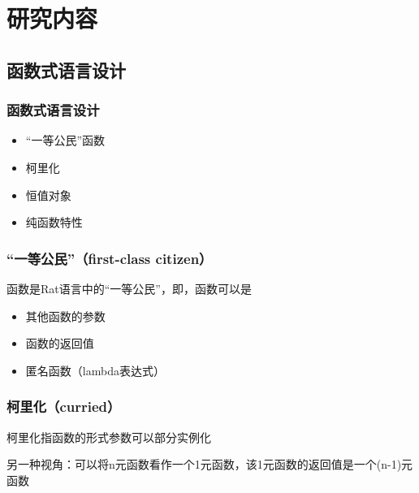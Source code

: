 \documentclass[]{beamer}
\begin{document}
\section{研究内容}
\frame{\tableofcontents[currentsection]}

\subsection{函数式语言设计}

\begin{frame}
  \frametitle{函数式语言设计}
  \begin{itemize}
    \item “一等公民”函数
    \item 柯里化
    \item 恒值对象
    \item 纯函数特性
  \end{itemize}
\end{frame}

\begin{frame}
  \frametitle{“一等公民”（first-class citizen）}
  函数是Rat语言中的“一等公民”，即，函数可以是
  \begin{itemize}
    \item 其他函数的参数
      
    \item 函数的返回值\\
      
    \item 匿名函数（lambda表达式）\\
      
  \end{itemize}
\end{frame}

\begin{frame}
  \frametitle{柯里化（curried）}
  柯里化指函数的形式参数可以部分实例化
  

  另一种视角：可以将n元函数看作一个1元函数，该1元函数的返回值是一个(n-1)元函数
  
\end{frame}
\end{document}
